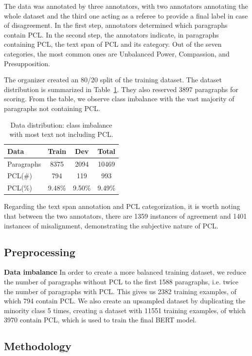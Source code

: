 \documentclass[11pt]{article}
\begin{document}
The data was annotated by three annotators, with two annotators annotating the whole dataset and the third one acting as a referee to provide a final label in case of disagreement. In the first step, annotators determined which paragraphs contain PCL. In the second step, the annotators indicate, in paragraphs containing PCL, the text span of PCL and its category. Out of the seven categories, the most common ones are Unbalanced Power, Compassion, and Presupposition.

The organizer created an 80/20 split of the training dataset. The dataset distribution is summarized in Table~\ref{tab:dist}. They also reserved 3897 paragraphs for scoring. From the table, we observe class imbalance with the vast majority of paragraphs not containing PCL.

\begin{table}
\centering
\begin{tabular}{lccc}
\hline
\textbf{Data} & \textbf{Train} & \textbf{Dev} & \textbf{Total} \\
\hline
Paragraphs & 8375 & 2094 & 10469  \\
PCL(\#) & 794 & 119 & 993  \\
\hline
PCL(\%) & 9.48\% & 9.50\% & 9.49\% \\
\hline
\end{tabular}
\caption{Data distribution: class imbalance with most text not including PCL.}
\label{tab:dist}
\end{table}

Regarding the text span annotation and PCL categorization, it is worth noting that between the two annotators, there are 1359 instances of agreement and 1401 instances of misalignment, demonstrating the subjective nature of PCL.


\subsection{Preprocessing}

\textbf{Data imbalance}  In order to create a more balanced training dataset, we reduce the number of paragraphs without PCL to the first 1588 paragraphs, i.e. twice the number of paragraphs with PCL. This gives us 2382 training examples, of which 794 contain PCL. We also create an upsampled dataset by duplicating the minority class 5 times, creating a dataset with 11551 training examples, of which 3970 contain PCL, which is used to train the final BERT model.


\subsection{Methodology}
\end{document}

